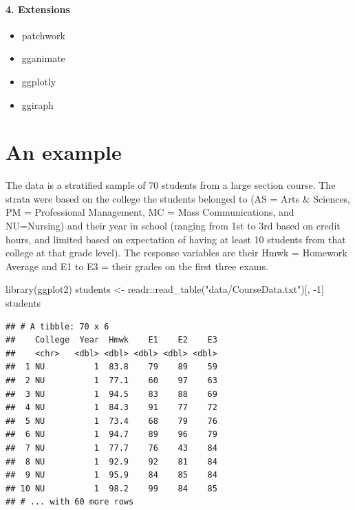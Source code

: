 \documentclass[
]{book}
\newenvironment{Shaded}{\begin{snugshade}}{\end{snugshade}}
\newcommand{\DecValTok}[1]{\textcolor[rgb]{0.00,0.00,0.81}{#1}}
\newcommand{\FunctionTok}[1]{\textcolor[rgb]{0.00,0.00,0.00}{#1}}
\newcommand{\NormalTok}[1]{#1}
\newcommand{\OtherTok}[1]{\textcolor[rgb]{0.56,0.35,0.01}{#1}}
\newcommand{\SpecialCharTok}[1]{\textcolor[rgb]{0.00,0.00,0.00}{#1}}
\newcommand{\StringTok}[1]{\textcolor[rgb]{0.31,0.60,0.02}{#1}}
\providecommand{\tightlist}{%
  \setlength{\itemsep}{0pt}\setlength{\parskip}{0pt}}
\begin{document}
\hypertarget{extensions}{%
\paragraph*{4. Extensions}\label{extensions}}

\begin{itemize}
\tightlist
\item
  patchwork
\item
  gganimate
\item
  ggplotly
\item
  ggiraph
\end{itemize}

\hypertarget{an-example}{%
\section{An example}\label{an-example}}

The data is a stratified sample of 70 students from a large section course. The strata were based on the college the students belonged to (AS = Arts \& Sciences, PM = Professional Management, MC = Mass Communications, and NU=Nursing) and their year in school (ranging from 1st to 3rd based on credit hours, and limited based on expectation of having at least 10 students from that college at that grade level). The response variables are their Hmwk = Homework Average and E1 to E3 = their grades on the first three exams.

\begin{Shaded}
\begin{Highlighting}[]
\FunctionTok{library}\NormalTok{(ggplot2)}
\NormalTok{students }\OtherTok{\textless{}{-}}\NormalTok{ readr}\SpecialCharTok{::}\FunctionTok{read\_table}\NormalTok{(}\StringTok{"data/CourseData.txt"}\NormalTok{)[, }\SpecialCharTok{{-}}\DecValTok{1}\NormalTok{]}
\NormalTok{students}
\end{Highlighting}
\end{Shaded}

\begin{verbatim}
## # A tibble: 70 x 6
##    College  Year  Hmwk    E1    E2    E3
##    <chr>   <dbl> <dbl> <dbl> <dbl> <dbl>
##  1 NU          1  83.8    79    89    59
##  2 NU          1  77.1    60    97    63
##  3 NU          1  94.5    83    88    69
##  4 NU          1  84.3    91    77    72
##  5 NU          1  73.4    68    79    76
##  6 NU          1  94.7    89    96    79
##  7 NU          1  77.7    76    43    84
##  8 NU          1  92.9    92    81    84
##  9 NU          1  95.9    84    85    84
## 10 NU          1  98.2    99    84    85
## # ... with 60 more rows
\end{verbatim}
\end{document}
